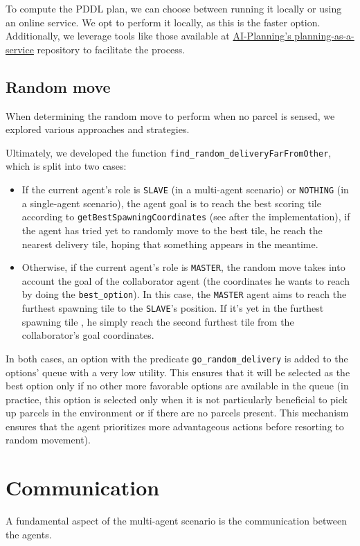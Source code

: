 \documentclass[10pt]{article}
\begin{document}
To compute the PDDL plan, we can choose between running it locally or using an online service. We opt to perform it locally, as this is the faster option. Additionally, we leverage tools like those available at \href{https://github.com/AI-Planning/planning-as-a-service}{AI-Planning's planning-as-a-service} repository to facilitate the process.
 

\subsection{Random move}

When determining the random move to perform when no parcel is sensed, we explored various approaches and strategies. 

Ultimately, we developed the function \texttt{find\_random\_deliveryFarFromOther}, which is split into two cases:

\begin{itemize}
\item If the current agent's role is \texttt{SLAVE} (in a multi-agent scenario) or \texttt{NOTHING} (in a single-agent scenario), the agent goal is to reach the best scoring tile according to \texttt{getBestSpawningCoordinates} (see after the implementation), if the agent has tried yet to randomly move to the best tile, he reach the nearest delivery tile, hoping that something appears in the meantime.
\item Otherwise, if the current agent's role is \texttt{MASTER}, the random move takes into account the goal of the collaborator agent (the coordinates he wants to reach by doing the \texttt{best\_option}). In this case, the \texttt{MASTER} agent aims to reach the furthest spawning tile to the \texttt{SLAVE}'s position. If it's yet in the furthest spawning tile , he simply reach the second furthest tile from the collaborator's goal coordinates.
\end{itemize}

In both cases, an option with the predicate \texttt{go\_random\_delivery} is added to the options' queue with a very low utility. This ensures that it will be selected as the best option only if no other more favorable options are available in the queue (in practice, this option is selected only when it is not particularly beneficial to pick up parcels in the environment or if there are no parcels present. This mechanism ensures that the agent prioritizes more advantageous actions before resorting to random movement).

\section{Communication}
A fundamental aspect of the multi-agent scenario is the communication between the agents.
\end{document}
